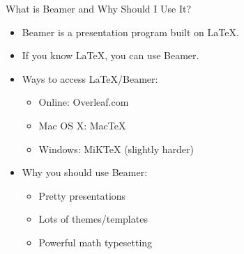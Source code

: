 



\begin{frame}
    \titlepage
\end{frame}


\begin{frame}{What is Beamer and Why Should I Use It?}
	\begin{block}{}
		\begin{itemize}[<+->]
		\item Beamer is a presentation program built on \LaTeX.
		\item If you know \LaTeX, you can use Beamer.
		\item Ways to access \LaTeX/Beamer:
		\begin{itemize}
			\item Online: Overleaf.com
			\item Mac OS X: MacTeX
			\item Windows: MiKTeX (slightly harder)
		\end{itemize}
		\item Why you should use Beamer:
		\begin{itemize}
			\item Pretty presentations
			\item Lots of themes/templates
			\item Powerful math typesetting
		\end{itemize}
	\end{itemize}
\end{block}
\end{frame}


